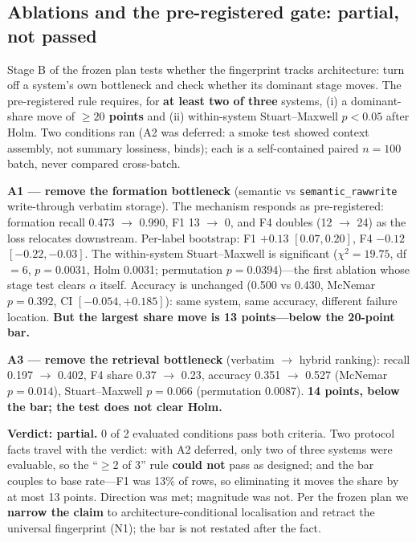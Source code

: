 \documentclass[11pt]{article}
\begin{document}
\subsection{Ablations and the pre-registered gate: partial, not passed}
\label{sec:localisation:gate}

Stage B of the frozen plan tests whether the fingerprint tracks architecture:
turn off a system's own bottleneck and check whether its dominant stage moves.
The pre-registered rule requires, for \textbf{at least two of three} systems,
(i) a dominant-share move of \textbf{$\geq 20$ points} and (ii) within-system
Stuart--Maxwell $p < 0.05$ after Holm. Two conditions ran (A2 was deferred:
a smoke test showed context assembly, not summary lossiness, binds); each is a
self-contained paired $n{=}100$ batch, never compared cross-batch.

\textbf{A1 --- remove the formation bottleneck} (semantic vs
\texttt{semantic\_rawwrite} write-through verbatim storage). The mechanism responds as pre-registered: formation recall
0.473 $\to$ 0.990, F1 13 $\to$ 0, and F4 doubles (12 $\to$ 24) as the loss
relocates downstream. Per-label bootstrap: F1 $+0.13$ $[0.07, 0.20]$, F4
$-0.12$ $[-0.22, -0.03]$. The within-system
Stuart--Maxwell is significant ($\chi^2 = 19.75$, df $= 6$,
\textbf{$p = 0.0031$}, Holm 0.0031; permutation $p = 0.0394$)---the first
ablation whose stage test clears $\alpha$ itself. Accuracy is unchanged
(0.500 vs 0.430, McNemar $p = 0.392$, CI $[-0.054, +0.185]$): same system,
same accuracy, different failure location. \textbf{But the largest share move
is 13 points---below the 20-point bar.}

\textbf{A3 --- remove the retrieval bottleneck} (verbatim $\to$ hybrid
ranking): recall 0.197 $\to$ 0.402, F4 share 0.37 $\to$ 0.23, accuracy
0.351 $\to$ 0.527 (McNemar $p = 0.014$), Stuart--Maxwell $p = 0.066$
(permutation 0.0087). \textbf{14 points, below the bar; the test does not
clear Holm.}

\textbf{Verdict: partial.} 0 of 2 evaluated conditions pass both criteria. Two
protocol facts travel with the verdict: with A2 deferred, only two of three
systems were evaluable, so the ``$\geq$2 of 3'' rule \textbf{could not} pass
as designed; and the bar couples to base rate---F1 was 13\% of rows, so
eliminating it moves the share by at most 13 points. Direction was met;
magnitude was not. Per the
frozen plan we \textbf{narrow the claim} to architecture-conditional
localisation and retract the universal fingerprint (N1); the bar is not
restated after the fact.
\end{document}
